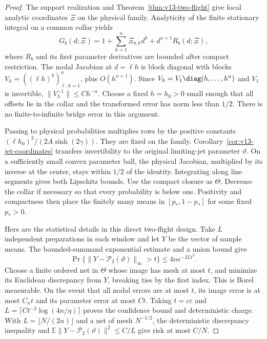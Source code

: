 \begin{proof}
The support realization and Theorem~\ref{thm:v13-two-flight} give
local analytic coordinates $\Xi$ on the physical family. Analyticity
of the finite stationary integral on a common collar yields
\[
 G_b(d;\Xi)=1+\sum_{k=1}^n\Xi_{b,k}d^k
                          +d^{n+1}R_b(d;\Xi),
\]
where $R_b$ and its first parameter derivatives are bounded after
compact restriction. The nodal Jacobian at $d=\ell h$ is block
diagonal with blocks $V_h=((\ell h)^k)_{\ell,k=1}^n$, plus
$O(h^{n+1})$. Since
$V_h=V_1\diag(h,\ldots,h^n)$ and $V_1$ is invertible,
$\|V_h^{-1}\|\le C h^{-n}$. Choose a fixed $h=h_0>0$ small
enough that all offsets lie in the collar and the transformed error
has norm less than $1/2$. There is no finite-to-infinite bridge error
in this argument.

Passing to physical probabilities multiplies rows by the positive
constants $(\ell h_0)^2/(2A\sinh(2\gamma))$. They are fixed on the
family. Corollary~\ref{cor:v13-jet-coordinates} transfers invertibility
to the original limiting-jet parameter $\vartheta$. On a sufficiently
small convex parameter ball, the physical Jacobian, multiplied by its
inverse at the center, stays within $1/2$ of the identity. Integrating
along line segments gives both Lipschitz bounds. Use the compact
closure as $\Theta$. Decrease the collar if necessary so that every
probability is below one. Positivity and compactness then place the
finitely many means in $[p_*,1-p_*]$ for some fixed $p_*>0$.

Here are the statistical details in this direct two-flight design.
Take $L$ independent preparations in each window and let $Y$ be the
vector of sample means. The bounded-summand exponential estimate and
a union bound give
\[
 \Pr\{\|Y-\mathcal P_2(\vartheta)\|_\infty>t\}
                                  \le4n e^{-2Lt^2}.
\]
Choose a finite ordered net in $\Theta$ whose image has mesh at most
$t$, and minimize its Euclidean discrepancy from $Y$, breaking ties
by the first index. This is Borel measurable. On the event that all
nodal errors are at most $t$, its image error is at most $C_nt$ and
its parameter error at most $Ct$. Taking $t=c\varepsilon$ and
$L=\lceil Ct^{-2}\log(4n/\eta)\rceil$ proves the confidence bound
and deterministic charge. With $L=\lfloor N/(2n)\rfloor$ and a
net of mesh $N^{-1/2}$, the deterministic discrepancy inequality and
$\mathbb E\|Y-\mathcal P_2(\vartheta)\|^2\le C/L$ give risk
at most $C/N$.


\end{proof}
